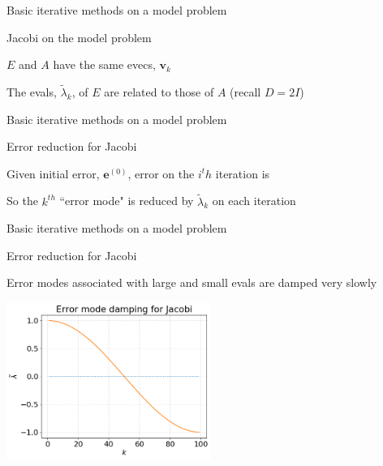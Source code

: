 \documentclass[18pt,xcolor=table]{beamer}
\begin{document}
\begin{frame}{Basic iterative methods on a model problem}
\begin{block}{Jacobi on the model problem}
\bit
\item $E$ and $A$ have the same evecs, $\mathbf{v}_k$
\item The evals, $\tilde\lambda_k$, of $E$ are related to those of $A$ (recall $D = 2I$)
\eit
\end{block}
\end{frame}


\begin{frame}{Basic iterative methods on a model problem}
\begin{block}{Error reduction for Jacobi}
\bit
\item Given initial error, $\mathbf{e}^{(0)}$, error on the $i^th$ iteration is 
\item So the $k^{th}$ ``error mode" is reduced by $\tilde\lambda_k$ on each iteration
\eit
\end{block}
\end{frame}

\begin{frame}{Basic iterative methods on a model problem}
\begin{block}{Error reduction for Jacobi}
\bit
\item Error modes associated with large and small evals are damped very slowly
\eit
\end{block}
\begin{center}
\includegraphics[width=0.5\textwidth]{../figures/jacobiModeDamping} %
\end{center}
\end{frame}
\end{document}
